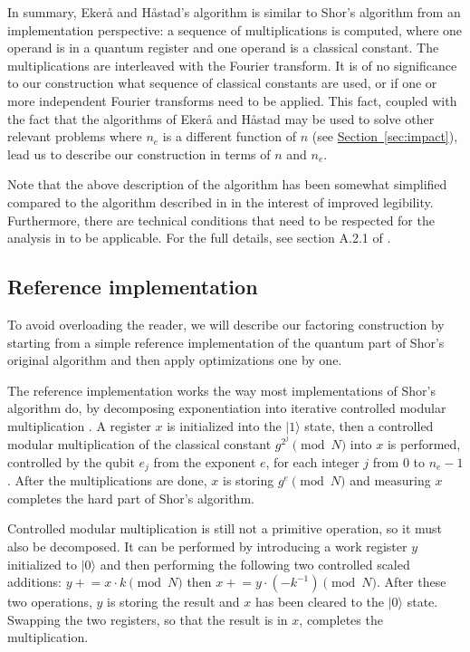 \documentclass[superscriptaddress,notitlepage,longbibliography]{revtex4-1}
\theoremstyle{definition}
\theoremstyle{definition}
\renewcommand{\sec}[1]{\hyperref[sec:#1]{Section~\ref*{sec:#1}}}
\newcommand{\lenexp}{{n_e}}
\newcommand{\productreg}{x}
\newcommand{\workreg}{y}
\newcommand{\gen}{g}
\begin{document}
In summary, Ekerå and Håstad's algorithm is similar to Shor's algorithm from an implementation perspective:
a sequence of multiplications is computed, where one operand is in a quantum register and one operand is a classical constant.
The multiplications are interleaved with the Fourier transform.
It is of no significance to our construction what sequence of classical constants are used, or if one or more independent Fourier transforms need to be applied.
This fact, coupled with the fact that the algorithms of Ekerå and Håstad may be used to solve other relevant problems where $n_e$ is a different function of $n$ (see \sec{impact}), lead us to describe our construction in terms of $n$ and $n_e$.

Note that the above description of the algorithm has been somewhat simplified compared to the algorithm described in \cite{ekeraa2017quantum, ekeraa2017pp} in the interest of improved legibility.
Furthermore, there are technical conditions that need to be respected for the analysis in \cite{ekeraa2017pp} to be applicable.
For the full details, see section A.2.1 of \cite{ekeraa2017pp}.

\subsection{Reference implementation}

To avoid overloading the reader, we will describe our factoring construction by starting from a simple reference implementation of the quantum part of Shor's original algorithm and then apply optimizations one by one.

The reference implementation works the way most implementations of Shor's algorithm do, by decomposing exponentiation into iterative controlled modular multiplication \cite{vedral1996arithmetic, zalka1998fast, zalka2006pure, beauregard2002shor, haner2016factoring, gidney2017factoring}.
A register $\productreg$ is initialized into the $|1\rangle$ state, then a controlled modular multiplication of the classical constant $\gen^{2^j} \pmod{N}$ into $\productreg$ is performed, controlled by the qubit $e_j$ from the exponent $e$, for each integer $j$ from $0$ to $\lenexp-1$.
After the multiplications are done, $\productreg$ is storing $\gen^e \pmod{N}$ and measuring $\productreg$ completes the hard part of Shor's algorithm.

Controlled modular multiplication is still not a primitive operation, so it must also be decomposed.
It can be performed by introducing a work register $\workreg$ initialized to $|0\rangle$ and then performing the following two controlled scaled additions: $\workreg \mathrel{+}= \productreg \cdot k \pmod{N}$ then $\productreg \mathrel{+}= \workreg \cdot (-k^{-1}) \pmod{N}$.
After these two operations, $\workreg$ is storing the result and $\productreg$ has been cleared to the $|0\rangle$ state.
Swapping the two registers, so that the result is in $\productreg$, completes the multiplication.
\end{document}
